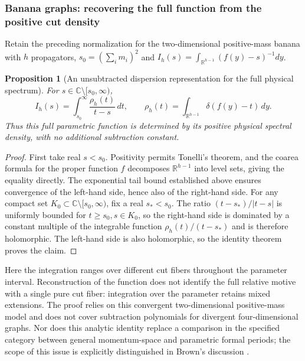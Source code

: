 \documentclass[11pt,a4paper,oneside]{article}
\theoremstyle{plain}
\newtheorem{proposition}[theorem]{Proposition}
\theoremstyle{definition}
\theoremstyle{remark}
\numberwithin{equation}{section}
\begin{document}
\subsubsection{Banana graphs: recovering the full function from the positive cut density}
Retain the preceding normalization for the two-dimensional positive-mass banana with $h$ propagators,
$s_0=(\sum_i m_i)^2$ and $I_h(s)=\int_{\mathbb R^{h-1}}(f(y)-s)^{-1}dy$.

\begin{proposition}[An unsubtracted dispersion representation for the full physical spectrum]\label{unified:prop:dispersion}
For $s\in\mathbb C\setminus[s_0,\infty)$,
\[
 I_h(s)=\int_{s_0}^{\infty}\frac{\rho_h(t)}{t-s}\,dt,
 \qquad
 \rho_h(t)=\int_{\mathbb R^{h-1}}\delta(f(y)-t)\,dy .
\]
Thus this full parametric function is determined by its positive physical spectral density, with no additional subtraction constant.
\end{proposition}
\begin{proof}
First take real $s<s_0$. Positivity permits Tonelli's theorem, and the coarea formula for the proper function $f$ decomposes
$\mathbb R^{h-1}$ into level sets, giving the equality directly.
The exponential tail bound established above ensures convergence of the left-hand side, hence also of the right-hand side.
For any compact set $K_0\subset\mathbb C\setminus[s_0,\infty)$,
fix a real $s_*<s_0$.
The ratio $(t-s_*)/|t-s|$ is uniformly bounded for $t\ge s_0,s\in K_0$,
so the right-hand side is dominated by a constant multiple of the integrable function $\rho_h(t)/(t-s_*)$
and is therefore holomorphic. The left-hand side is also holomorphic, so the identity theorem proves the claim.
\end{proof}
Here the integration ranges over different cut fibers throughout the parameter interval.
Reconstruction of the function does not identify the full relative motive with a single pure cut fiber:
integration over the parameter retains mixed extensions.
The proof relies on this convergent two-dimensional positive-mass model and does not cover subtraction polynomials for divergent four-dimensional graphs.
Nor does this analytic identity replace a comparison in the specified category between general momentum-space and parametric formal periods;
the scope of this issue is explicitly distinguished in Brown's discussion \cite[\S10.2]{browncosmic}.
\end{document}
